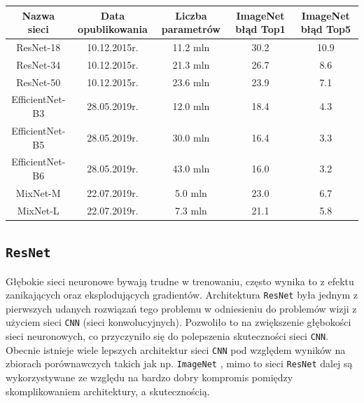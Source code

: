 \begin{center}
\begin{tabular}{ |c|c|c|c|c| } 
\hline
Nazwa sieci & Data opublikowania & Liczba parametrów & ImageNet błąd Top1 & ImageNet błąd Top5\\
\hline
ResNet-18 & 10.12.2015r. & 11.2 mln & 30.2 & 10.9\\
\hline
ResNet-34 & 10.12.2015r. & 21.3 mln & 26.7 & 8.6\\
\hline
ResNet-50 & 10.12.2015r. & 23.6 mln & 23.9 & 7.1\\
\hline
EfficientNet-B3 & 28.05.2019r. & 12.0 mln & 18.4 & 4.3\\
\hline
EfficientNet-B5 & 28.05.2019r. & 30.0 mln & 16.4 & 3.3\\
\hline
EfficientNet-B6 & 28.05.2019r. & 43.0 mln & 16.0 & 3.2\\
\hline
MixNet-M & 22.07.2019r. & 5.0 mln & 23.0 & 6.7\\
\hline
MixNet-L & 22.07.2019r. & 7.3 mln & 21.1 & 5.8\\
\hline
\end{tabular}
\end{center}

\subsection{\texttt{ResNet}}
Głębokie sieci neuronowe bywają trudne w trenowaniu, często wynika to z efektu zanikających oraz eksplodujących gradientów. Architektura \texttt{ResNet} \cite{1512.03385} była jednym z pierwszych udanych rozwiązań tego problemu w odniesieniu do problemów wizji z użyciem sieci \texttt{CNN} (sieci konwolucyjnych). Pozwoliło to na zwiększenie głębokości sieci neuronowych, co przyczyniło się do polepszenia skuteczności sieci \texttt{CNN}. Obecnie istnieje wiele lepszych architektur sieci  \texttt{CNN} pod względem wyników na zbiorach porównawczych takich jak np. \texttt{ImageNet} \cite{deng2009imagenet}, mimo to sieci \texttt{ResNet} dalej są wykorzystywane ze względu na bardzo dobry kompromis pomiędzy skomplikowaniem architektury, a skutecznością.

\newpage

